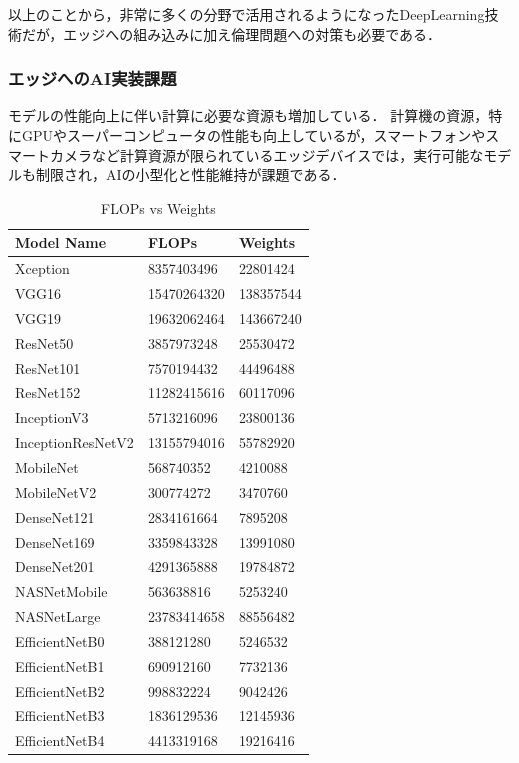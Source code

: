 以上のことから，非常に多くの分野で活用されるようになったDeepLearning技術だが，エッジへの組み込みに加え倫理問題への対策も必要である．

\subsubsection{エッジへのAI実装課題}

モデルの性能向上に伴い計算に必要な資源も増加している．
計算機の資源，特にGPUやスーパーコンピュータの性能も向上しているが，スマートフォンやスマートカメラなど計算資源が限られているエッジデバイスでは，実行可能なモデルも制限され，AIの小型化と性能維持が課題である．

\begin{table}[H]
	\caption{FLOPs vs Weights}
	\label{table:flops_vs_weights}
	\centering
	\begin{tabular}{lll}
		\hline
		Model Name & FLOPs & Weights \\ 
		\hline \hline 
		Xception & 8357403496 & 22801424 \\ 
		VGG16 & 15470264320 & 138357544 \\ 
		VGG19 & 19632062464 & 143667240 \\ 
		ResNet50 & 3857973248 & 25530472 \\ 
		ResNet101 & 7570194432 & 44496488 \\ 
		ResNet152 & 11282415616 & 60117096 \\ 
		InceptionV3 & 5713216096 & 23800136 \\ 
		InceptionResNetV2 & 13155794016 & 55782920 \\ 
		MobileNet & 568740352 & 4210088 \\ 
		MobileNetV2 & 300774272 & 3470760 \\ 
		DenseNet121 & 2834161664 & 7895208 \\ 
		DenseNet169 & 3359843328 & 13991080 \\ 
		DenseNet201 & 4291365888 & 19784872 \\ 
		NASNetMobile & 563638816 & 5253240 \\ 
		NASNetLarge & 23783414658 & 88556482 \\ 
		EfficientNetB0 & 388121280 & 5246532 \\ 
		EfficientNetB1 & 690912160 & 7732136 \\ 
		EfficientNetB2 & 998832224 & 9042426 \\ 
		EfficientNetB3 & 1836129536 & 12145936 \\ 
		EfficientNetB4 & 4413319168 & 19216416 \\ 

\end{tabular}
\end{table}
